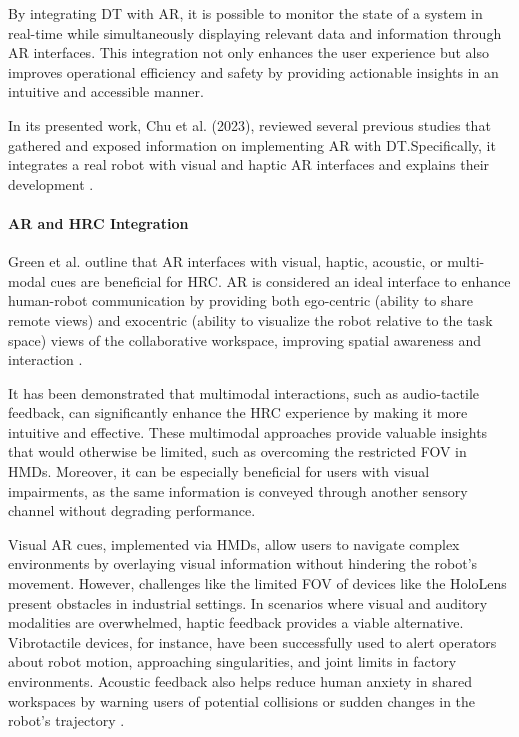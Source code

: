 By integrating \ac{DT} with \ac{AR}, it is possible to monitor the state of a system in real-time while simultaneously displaying relevant
data and information through \ac{AR} interfaces. This integration not only enhances the user experience but also improves operational efficiency and 
safety by providing actionable insights in an intuitive and accessible manner.




    In its presented work, Chu et al. (2023), reviewed several previous studies that gathered and exposed information on implementing \ac{AR} with \ac{DT}.Specifically, it integrates a real robot with visual and haptic \ac{AR} interfaces and explains their development \cite{CHU2023313}.
    
    \paragraph{\textbf{\ac{AR} and \ac{HRC} Integration}}
    Green et al. outline that \ac{AR} interfaces with visual, haptic, acoustic, or multi-modal cues are beneficial for \ac{HRC}. \ac{AR} is considered an ideal interface to enhance human-robot communication by providing both ego-centric (ability to share remote views) and exocentric (ability to visualize the robot relative to the task space) views of the collaborative workspace, improving spatial awareness and interaction \cite{doi:10.5772/5664}. 
    
    It has been demonstrated that multimodal interactions, such as audio-tactile feedback, can significantly enhance the \ac{HRC} experience by making it more intuitive and effective. These multimodal approaches provide valuable insights that would otherwise be limited, such as overcoming the restricted \ac{FOV} in \ac{HMDs}.
    Moreover, it can be especially beneficial for users with visual impairments, as the same information is conveyed through another sensory channel without degrading performance.

    Visual \ac{AR} cues, implemented via \ac{HMDs}, allow users to navigate complex environments by overlaying visual information without hindering the robot’s movement. However, challenges like the limited \ac{FOV} of devices like the HoloLens present obstacles in industrial settings.
    In scenarios where visual and auditory modalities are overwhelmed, haptic feedback provides a viable alternative. Vibrotactile devices, for instance, have been successfully used to alert operators about robot motion, approaching singularities, and joint limits in factory environments. Acoustic feedback also helps reduce human anxiety in shared workspaces by warning users of potential collisions or sudden changes in the robot’s trajectory \cite{9199570}.

